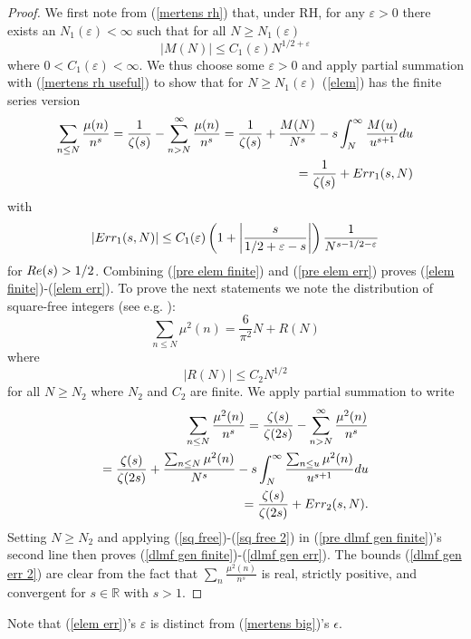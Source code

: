 \documentclass[11pt,article]{amsart}
\numberwithin{equation}{section}
\numberwithin{equation}{section}
\numberwithin{lemma}{section}
\numberwithin{prop}{section}
\begin{document}
\begin{proof}
We first note from (\ref{mertens rh}) that, under RH, for any $\varepsilon>0$ there exists an $N_{1}(\varepsilon)<\infty$ such that for all $N\geq N_{1}(\varepsilon)$
\begin{equation}
\left|M(N)\right|\leq C_{1}(\varepsilon) N^{1/2+\varepsilon} \label{mertens rh useful}
\end{equation}
where $0<C_{1}(\varepsilon)<\infty$. We thus choose some $\varepsilon>0$ and apply partial summation with (\ref{mertens rh useful}) to show that for $N\geq N_{1}(\varepsilon)$ (\ref{elem}) has the finite series version
\begin{align}
\sum_{n\leq N}\frac{\mu(n)}{n^{s}}=\frac{1}{\zeta(s)}-\sum_{n>N}^{\infty}\frac{\mu(n)}{n^{s}}=\frac{1}{\zeta(s)}+\frac{M(N)}{N^{s}}-s\int_{N}^{\infty}\frac{M(u)}{u^{s+1}}du \nonumber \\ =\frac{1}{\zeta(s)}+\textnormal{Err}_{1}(s,N) \label{pre elem finite}
\end{align}
with 
\begin{align}
\left|\textnormal{Err}_{1}(s,N)\right|\leq C_{1}(\varepsilon)\left(1+\left|\frac{s}{1/2+\varepsilon-s}\right|\right)\frac{1}{N^{s-1/2-\varepsilon}} \label{pre elem err}
\end{align}
for $\textnormal{Re}(s)>1/2$. Combining (\ref{pre elem finite}) and (\ref{pre elem err}) proves (\ref{elem finite})-(\ref{elem err}). To prove the next statements we note the distribution of square-free integers (see e.g. \cite{hardy wright}):
\begin{equation}
\sum_{n\leq N}\mu^{2}(n)=\frac{6}{\pi^{2}}N+R(N) \label{sq free}
\end{equation}
where
\begin{equation}
\left|R(N)\right|\leq C_{2}N^{1/2} \label{sq free 2}
\end{equation}
for all $N\geq N_{2}$ where $N_{2}$ and $C_{2}$ are finite. We apply partial summation to write 
\begin{align}
\sum_{n\leq N}\frac{\mu^{2}(n)}{n^{s}}=\frac{\zeta(s)}{\zeta(2s)}-\sum_{n>N}^{\infty}\frac{\mu^{2}(n)}{n^{s}} \nonumber \\=\frac{\zeta(s)}{\zeta(2s)}+\frac{\sum_{n\leq N}\mu^{2}(n)}{N^{s}}-s\int_{N}^{\infty}\frac{\sum_{n\leq u}\mu^{2}(n)}{u^{s+1}}du \nonumber \\ =\frac{\zeta(s)}{\zeta(2s)}+\textnormal{Err}_{2}(s,N). \label{pre dlmf gen finite}
\end{align}
Setting $N\geq N_{2}$ and applying (\ref{sq free})-(\ref{sq free 2}) in (\ref{pre dlmf gen finite})'s second line then proves (\ref{dlmf gen finite})-(\ref{dlmf gen err}). The bounds (\ref{dlmf gen err 2}) are clear from the fact that $\sum_{n}\frac{\mu^{2}(n)}{n^{s}}$ is real, strictly positive, and convergent for $s\in \mathbb{R}$ with $s>1$. 
\end{proof}
Note that (\ref{elem err})'s $\varepsilon$  is distinct from (\ref{mertens big})'s $\epsilon$. 
\end{document}
